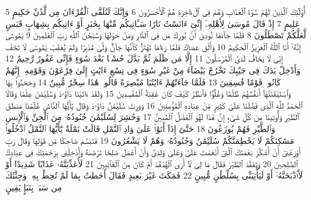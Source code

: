{\tiny\colorbox{cl_aya}{5}} أُو۟لَٰٓئِكَ ٱلَّذِينَ لَهُمْ سُوٓءُ ٱلْعَذَابِ وَهُمْ فِى ٱلْءَاخِرَةِ هُمُ ٱلْأَخْسَرُونَ
{\tiny\colorbox{cl_aya}{6}} وَإِنَّكَ لَتُلَقَّى ٱلْقُرْءَانَ مِن لَّدُنْ حَكِيمٍ عَلِيمٍ
{\tiny\colorbox{cl_aya}{7}} إِذْ قَالَ مُوسَىٰ لِأَهْلِهِۦٓ إِنِّىٓ ءَانَسْتُ نَارًا سَـَٔاتِيكُم مِّنْهَا بِخَبَرٍ أَوْ ءَاتِيكُم بِشِهَابٍ قَبَسٍ لَّعَلَّكُمْ تَصْطَلُونَ
{\tiny\colorbox{cl_aya}{8}} فَلَمَّا جَآءَهَا نُودِىَ أَنۢ بُورِكَ مَن فِى ٱلنَّارِ وَمَنْ حَوْلَهَا وَسُبْحَٰنَ ٱللَّهِ رَبِّ ٱلْعَٰلَمِينَ
{\tiny\colorbox{cl_aya}{9}} يَٰمُوسَىٰٓ إِنَّهُۥٓ أَنَا ٱللَّهُ ٱلْعَزِيزُ ٱلْحَكِيمُ
{\tiny\colorbox{cl_aya}{10}} وَأَلْقِ عَصَاكَ فَلَمَّا رَءَاهَا تَهْتَزُّ كَأَنَّهَا جَآنٌّ وَلَّىٰ مُدْبِرًا وَلَمْ يُعَقِّبْ يَٰمُوسَىٰ لَا تَخَفْ إِنِّى لَا يَخَافُ لَدَىَّ ٱلْمُرْسَلُونَ
{\tiny\colorbox{cl_aya}{11}} إِلَّا مَن ظَلَمَ ثُمَّ بَدَّلَ حُسْنًۢا بَعْدَ سُوٓءٍ فَإِنِّى غَفُورٌ رَّحِيمٌ
{\tiny\colorbox{cl_aya}{12}} وَأَدْخِلْ يَدَكَ فِى جَيْبِكَ تَخْرُجْ بَيْضَآءَ مِنْ غَيْرِ سُوٓءٍ فِى تِسْعِ ءَايَٰتٍ إِلَىٰ فِرْعَوْنَ وَقَوْمِهِۦٓ إِنَّهُمْ كَانُوا۟ قَوْمًا فَٰسِقِينَ
{\tiny\colorbox{cl_aya}{13}} فَلَمَّا جَآءَتْهُمْ ءَايَٰتُنَا مُبْصِرَةً قَالُوا۟ هَٰذَا سِحْرٌ مُّبِينٌ
{\tiny\colorbox{cl_aya}{14}} وَجَحَدُوا۟ بِهَا وَٱسْتَيْقَنَتْهَآ أَنفُسُهُمْ ظُلْمًا وَعُلُوًّا فَٱنظُرْ كَيْفَ كَانَ عَٰقِبَةُ ٱلْمُفْسِدِينَ
{\tiny\colorbox{cl_aya}{15}} وَلَقَدْ ءَاتَيْنَا دَاوُۥدَ وَسُلَيْمَٰنَ عِلْمًا وَقَالَا ٱلْحَمْدُ لِلَّهِ ٱلَّذِى فَضَّلَنَا عَلَىٰ كَثِيرٍ مِّنْ عِبَادِهِ ٱلْمُؤْمِنِينَ
{\tiny\colorbox{cl_aya}{16}} وَوَرِثَ سُلَيْمَٰنُ دَاوُۥدَ وَقَالَ يَٰٓأَيُّهَا ٱلنَّاسُ عُلِّمْنَا مَنطِقَ ٱلطَّيْرِ وَأُوتِينَا مِن كُلِّ شَىْءٍ إِنَّ هَٰذَا لَهُوَ ٱلْفَضْلُ ٱلْمُبِينُ
{\tiny\colorbox{cl_aya}{17}} وَحُشِرَ لِسُلَيْمَٰنَ جُنُودُهُۥ مِنَ ٱلْجِنِّ وَٱلْإِنسِ وَٱلطَّيْرِ فَهُمْ يُوزَعُونَ
{\tiny\colorbox{cl_aya}{18}} حَتَّىٰٓ إِذَآ أَتَوْا۟ عَلَىٰ وَادِ ٱلنَّمْلِ قَالَتْ نَمْلَةٌ يَٰٓأَيُّهَا ٱلنَّمْلُ ٱدْخُلُوا۟ مَسَٰكِنَكُمْ لَا يَحْطِمَنَّكُمْ سُلَيْمَٰنُ وَجُنُودُهُۥ وَهُمْ لَا يَشْعُرُونَ
{\tiny\colorbox{cl_aya}{19}} فَتَبَسَّمَ ضَاحِكًا مِّن قَوْلِهَا وَقَالَ رَبِّ أَوْزِعْنِىٓ أَنْ أَشْكُرَ نِعْمَتَكَ ٱلَّتِىٓ أَنْعَمْتَ عَلَىَّ وَعَلَىٰ وَٰلِدَىَّ وَأَنْ أَعْمَلَ صَٰلِحًا تَرْضَىٰهُ وَأَدْخِلْنِى بِرَحْمَتِكَ فِى عِبَادِكَ ٱلصَّٰلِحِينَ
{\tiny\colorbox{cl_aya}{20}} وَتَفَقَّدَ ٱلطَّيْرَ فَقَالَ مَا لِىَ لَآ أَرَى ٱلْهُدْهُدَ أَمْ كَانَ مِنَ ٱلْغَآئِبِينَ
{\tiny\colorbox{cl_aya}{21}} لَأُعَذِّبَنَّهُۥ عَذَابًا شَدِيدًا أَوْ لَأَا۟ذْبَحَنَّهُۥٓ أَوْ لَيَأْتِيَنِّى بِسُلْطَٰنٍ مُّبِينٍ
{\tiny\colorbox{cl_aya}{22}} فَمَكَثَ غَيْرَ بَعِيدٍ فَقَالَ أَحَطتُ بِمَا لَمْ تُحِطْ بِهِۦ وَجِئْتُكَ مِن سَبَإٍۭ بِنَبَإٍ يَقِينٍ
